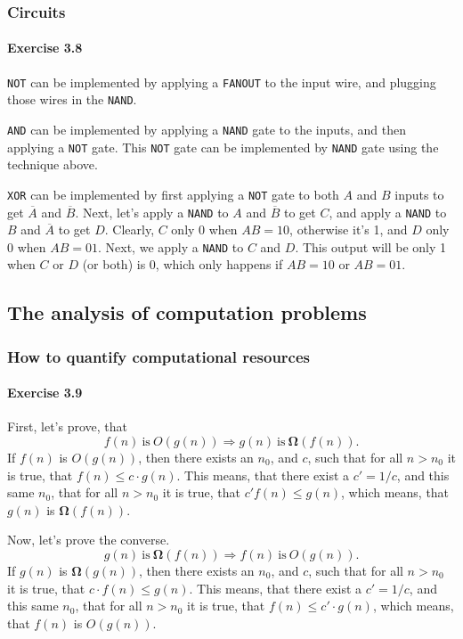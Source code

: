\documentclass[a4paper,12pt]{article}
\newcommand{\exercise}[1]{\paragraph{Exercise #1}}
\begin{document}
    \subsubsection{Circuits}

    \exercise{3.8} \texttt{NOT} can be implemented by applying a \texttt{FANOUT} to the input wire, and plugging those wires in the \texttt{NAND}.

    \texttt{AND} can be implemented by applying a \texttt{NAND} gate to the inputs, and then applying a \texttt{NOT} gate. This \texttt{NOT} gate can be implemented by \texttt{NAND} gate using the technique above.

    \texttt{XOR} can be implemented by first applying a \texttt{NOT} gate to both $A$ and $B$ inputs to get $\overline{A}$ and $\overline{B}$. Next, let's apply a \texttt{NAND} to $A$ and $\overline{B}$ to get $C$, and apply a \texttt{NAND} to $B$ and $\overline{A}$ to get $D$. Clearly, $C$ only 0 when $AB=10$, otherwise it's 1, and $D$ only $0$ when $AB=01$. Next, we apply a \texttt{NAND} to $C$ and $D$. This output will be only 1 when $C$ or $D$ (or both) is 0, which only happens if $AB=10$ or $AB=01$.

    \subsection{The analysis of computation problems}

    \subsubsection{How to quantify computational resources}

    \exercise{3.9} First, let's prove, that
    \begin{equation}
        f(n) \ \textrm{is} \ O(g(n)) \Rightarrow g(n) \ \textrm{is} \ \boldsymbol{\Omega}(f(n)) \textrm{.}
    \end{equation}
    If $f(n)$ is $O(g(n))$, then there exists an $n_0$, and $c$, such that for all $n > n_0$ it is true, that $f(n) \leq c \cdot g(n)$. This means, that there exist a $c' = 1/c$, and this same $n_0$, that for all $n > n_0$ it is true, that $c' f(n) \leq g(n)$, which means, that $g(n)$ is $\boldsymbol{\Omega}(f(n))$.

    Now, let's prove the converse.
    \begin{equation}
        g(n) \ \textrm{is} \ \boldsymbol{\Omega}(f(n)) \Rightarrow f(n) \ \textrm{is} \ O(g(n)) \textrm{.}
    \end{equation}
    If $g(n)$ is $\boldsymbol{\Omega}(g(n))$, then there exists an $n_0$, and $c$, such that for all $n > n_0$ it is true, that $c \cdot f(n) \leq g(n)$. This means, that there exist a $c' = 1/c$, and this same $n_0$, that for all $n > n_0$ it is true, that $f(n) \leq c' \cdot g(n)$, which means, that $f(n)$ is $O(g(n))$.
\end{document}
